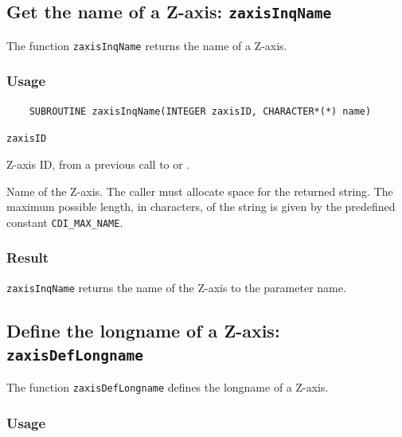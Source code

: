 \subsection{Get the name of a Z-axis: \texttt{zaxisInqName}}
\label{zaxisInqName}

The function {\texttt{zaxisInqName}} returns the name of a Z-axis.

\subsubsection*{Usage}

\begin{verbatim}
    SUBROUTINE zaxisInqName(INTEGER zaxisID, CHARACTER*(*) name)
\end{verbatim}

\hspace*{4mm}\begin{minipage}[]{15cm}
\begin{deflist}{\texttt{zaxisID}\ }
\item[\texttt{zaxisID}]
Z-axis ID, from a previous call to {} or {}.
\item[\texttt{name}]
Name of the Z-axis. The caller must allocate space for the
                    returned string. The maximum possible length, in characters, of
                    the string is given by the predefined constant {\texttt{CDI\_MAX\_NAME}}.

\end{deflist}
\end{minipage}

\subsubsection*{Result}

{\texttt{zaxisInqName}} returns the name of the Z-axis to the parameter name.



\subsection{Define the longname of a Z-axis: \texttt{zaxisDefLongname}}
\label{zaxisDefLongname}

The function {\texttt{zaxisDefLongname}} defines the longname of a Z-axis.

\subsubsection*{Usage}

